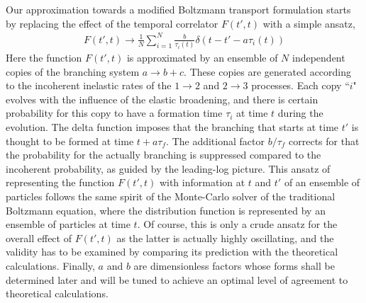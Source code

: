 \documentclass[aps, prc, reprint, amsmath, groupedaddress, nofootinbib]{revtex4-1}
\begin{document}
Our approximation towards a modified Boltzmann transport formulation starts by replacing the effect of the temporal correlator $F(t',t)$ with a simple ansatz,
\begin{eqnarray}
F(t', t) \rightarrow \frac{1}{N}\sum_{i=1}^N \frac{b}{\tau_i(t)} \delta(t-t'- a \tau_i(t))
\label{eq:ansatz}
\end{eqnarray}
Here the function $F(t', t)$ is approximated by an ensemble of $N$ independent copies of the branching system $a\rightarrow b+c$.
These copies are generated according to the incoherent inelastic rates of the $1\rightarrow 2$ and $2\rightarrow 3$ processes.
Each copy ``$i$" evolves with the influence of the elastic broadening, and there is certain probability for this copy to have a formation time $\tau_i$ at time $t$ during the evolution.
The delta function imposes that the branching that starts at time $t'$  is thought to be formed at time $t+a\tau_f$.
The additional factor $b/\tau_f$ corrects for that the probability for the actually branching is suppressed compared to the incoherent probability, as guided by the leading-log picture.
This ansatz of representing the function $F(t', t)$ with information at $t$ and $t'$ of an ensemble of particles follows the same spirit of the Monte-Carlo solver of the traditional Boltzmann equation, where the distribution function is represented by an ensemble of particles at time $t$.
Of course, this is only a crude ansatz for the overall effect of $F(t', t)$ as the latter is actually highly oscillating, and the validity has to be examined by comparing its prediction with the theoretical calculations.
Finally, $a$ and $b$ are dimensionless factors whose forms shall be determined later and will be tuned to achieve an optimal level of agreement to theoretical calculations.
\end{document}
